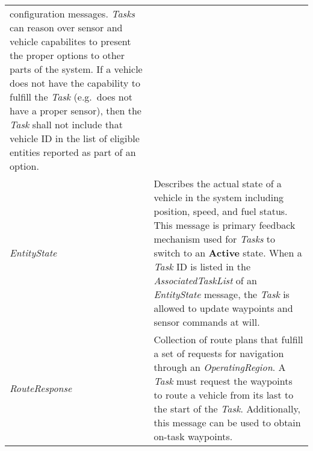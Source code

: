 \begin{longtable}[c]{@{}ll@{}}
\begin{minipage}[t]{0.65\columnwidth}
configuration messages. \emph{Tasks} can reason over sensor and vehicle
capabilites to present the proper options to other parts of the system.
If a vehicle does not have the capability to fulfill the \emph{Task}
(e.g.~does not have a proper sensor), then the \emph{Task} shall not
include that vehicle ID in the list of eligible entities reported as
part of an option.
\strut\end{minipage}\tabularnewline
\begin{minipage}[t]{0.29\columnwidth}\raggedright\strut
\emph{EntityState}
\strut\end{minipage} &
\begin{minipage}[t]{0.65\columnwidth}\raggedright\strut
Describes the actual state of a vehicle in the system including
position, speed, and fuel status. This message is primary feedback
mechanism used for \emph{Tasks} to switch to an \textbf{Active} state.
When a \emph{Task} ID is listed in the \emph{AssociatedTaskList} of an
\emph{EntityState} message, the \emph{Task} is allowed to update
waypoints and sensor commands at will.
\strut\end{minipage}\tabularnewline
\begin{minipage}[t]{0.29\columnwidth}\raggedright\strut
\emph{RouteResponse}
\strut\end{minipage} &
\begin{minipage}[t]{0.65\columnwidth}\raggedright\strut
Collection of route plans that fulfill a set of requests for navigation
through an \emph{OperatingRegion}. A \emph{Task} must request the
waypoints to route a vehicle from its last to the start of the
\emph{Task}. Additionally, this message can be used to obtain on-task
waypoints.
\strut\end{minipage}\tabularnewline
\bottomrule
\end{longtable}


